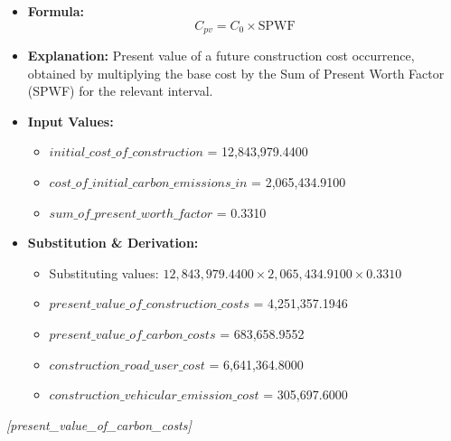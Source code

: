 \documentclass[12pt,a4paper]{article}
\begin{document}
\begin{itemize}
  \item \textbf{Formula:} $$C_{pv} = C_0 \times \text{SPWF}$$
  \item \textbf{Explanation:} Present value of a future construction cost occurrence, obtained by multiplying the base cost by the Sum of Present Worth Factor (SPWF) for the relevant interval.
  \item \textbf{Input Values:}
  \begin{itemize}
    \item $initial\_cost\_of\_construction$ = 12,843,979.4400
    \item $cost\_of\_initial\_carbon\_emissions\_in$ = 2,065,434.9100
    \item $sum\_of\_present\_worth\_factor$ = 0.3310
  \end{itemize}
  \item \textbf{Substitution \& Derivation:}
  \begin{itemize}
    \item Substituting values: $12,843,979.4400 \times 2,065,434.9100 \times 0.3310$
    \item $present\_value\_of\_construction\_costs$ = 4,251,357.1946
    \item $present\_value\_of\_carbon\_costs$ = 683,658.9552
    \item $construction\_road\_user\_cost$ = 6,641,364.8000
    \item $construction\_vehicular\_emission\_cost$ = 305,697.6000
  \end{itemize}
\end{itemize}


\textit{[present\_value\_of\_carbon\_costs]}
\end{document}
